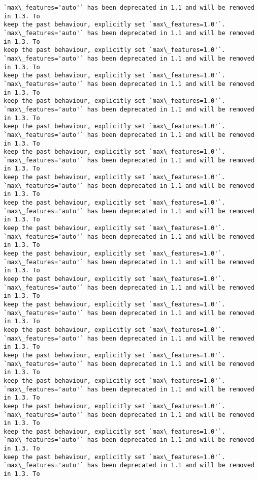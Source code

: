 \documentclass[11pt]{article}
\begin{document}
\begin{Verbatim}[commandchars=\\\{\}]
`max\_features='auto'` has been deprecated in 1.1 and will be removed in 1.3. To
keep the past behaviour, explicitly set `max\_features=1.0'`.
`max\_features='auto'` has been deprecated in 1.1 and will be removed in 1.3. To
keep the past behaviour, explicitly set `max\_features=1.0'`.
`max\_features='auto'` has been deprecated in 1.1 and will be removed in 1.3. To
keep the past behaviour, explicitly set `max\_features=1.0'`.
`max\_features='auto'` has been deprecated in 1.1 and will be removed in 1.3. To
keep the past behaviour, explicitly set `max\_features=1.0'`.
`max\_features='auto'` has been deprecated in 1.1 and will be removed in 1.3. To
keep the past behaviour, explicitly set `max\_features=1.0'`.
`max\_features='auto'` has been deprecated in 1.1 and will be removed in 1.3. To
keep the past behaviour, explicitly set `max\_features=1.0'`.
`max\_features='auto'` has been deprecated in 1.1 and will be removed in 1.3. To
keep the past behaviour, explicitly set `max\_features=1.0'`.
`max\_features='auto'` has been deprecated in 1.1 and will be removed in 1.3. To
keep the past behaviour, explicitly set `max\_features=1.0'`.
`max\_features='auto'` has been deprecated in 1.1 and will be removed in 1.3. To
keep the past behaviour, explicitly set `max\_features=1.0'`.
`max\_features='auto'` has been deprecated in 1.1 and will be removed in 1.3. To
keep the past behaviour, explicitly set `max\_features=1.0'`.
`max\_features='auto'` has been deprecated in 1.1 and will be removed in 1.3. To
keep the past behaviour, explicitly set `max\_features=1.0'`.
`max\_features='auto'` has been deprecated in 1.1 and will be removed in 1.3. To
keep the past behaviour, explicitly set `max\_features=1.0'`.
`max\_features='auto'` has been deprecated in 1.1 and will be removed in 1.3. To
keep the past behaviour, explicitly set `max\_features=1.0'`.
`max\_features='auto'` has been deprecated in 1.1 and will be removed in 1.3. To
keep the past behaviour, explicitly set `max\_features=1.0'`.
`max\_features='auto'` has been deprecated in 1.1 and will be removed in 1.3. To
keep the past behaviour, explicitly set `max\_features=1.0'`.
`max\_features='auto'` has been deprecated in 1.1 and will be removed in 1.3. To
keep the past behaviour, explicitly set `max\_features=1.0'`.
`max\_features='auto'` has been deprecated in 1.1 and will be removed in 1.3. To
keep the past behaviour, explicitly set `max\_features=1.0'`.
`max\_features='auto'` has been deprecated in 1.1 and will be removed in 1.3. To
keep the past behaviour, explicitly set `max\_features=1.0'`.
`max\_features='auto'` has been deprecated in 1.1 and will be removed in 1.3. To

\end{Verbatim}
\end{document}
